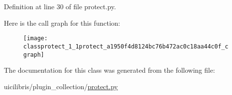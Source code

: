 \-Definition at line 30 of file protect.\-py.



\-Here is the call graph for this function\-:
\nopagebreak
\begin{figure}[H]
\begin{center}
\leavevmode
\texttt{[image: classprotect\_1\_1protect\_a1950f4d8124bc76b472ac0c18aa44c0f\_cgraph]}
\end{center}
\end{figure}




\-The documentation for this class was generated from the following file\-:\begin{DoxyCompactItemize}
\item 
uicilibris/plugin\-\_\-collection/\hyperlink{protect_8py}{protect.\-py}\end{DoxyCompactItemize}

